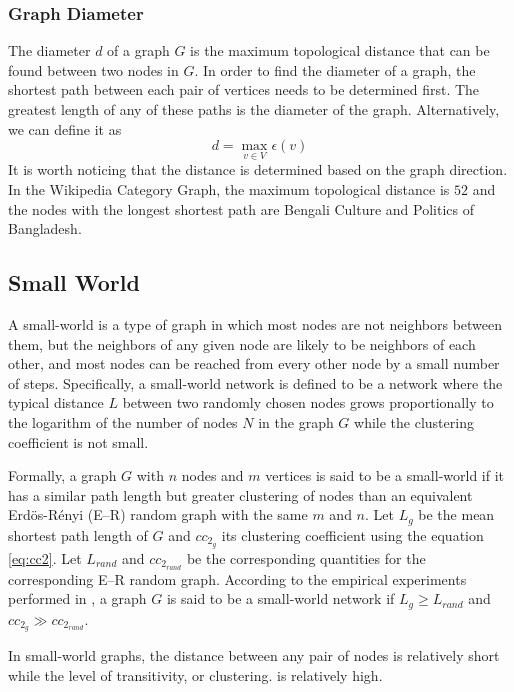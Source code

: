 \subsubsection{\hspace*{3pt} Graph Diameter}

The diameter $d$ of a graph $G$ is the maximum topological distance that can be found between two nodes in $G$. In order to find the diameter of a graph, the shortest path between each pair of vertices needs to be determined first. The greatest length of any of these paths is the diameter of the graph. Alternatively, we can define it as 
\begin{equation}
d=\max _{v\in V}\epsilon (v)
\end{equation}
It is worth noticing that the distance is determined based on the graph direction. In the Wikipedia Category Graph, the maximum topological distance is $52$ and the nodes with the longest shortest path are Bengali Culture and Politics of Bangladesh. 


\subsection{\hspace*{3pt} Small World}

A small-world is a type of graph in which most nodes are not neighbors between them, but the neighbors of any given node are likely to be neighbors of each other, and most nodes can be reached from every other node by a small number of steps. Specifically, a small-world network is defined to be a network where the typical distance $L$ between two randomly chosen nodes grows proportionally to the logarithm of the number of nodes $N$ in the graph $G$ while the clustering coefficient is not small.

Formally, a graph $G$ with $n$ nodes and $m$ vertices is said to be a small-world if it has a similar path length but greater clustering of nodes than an equivalent Erdös-Rényi (E–R) random graph with the same $m$ and $n$. Let $L_g$ be the mean shortest path length of $G$ and $cc_{2_g}$ its clustering coefficient using the equation \ref{eq:cc2}. Let $L_{rand}$ and  $cc_{2_{rand}}$ be the corresponding quantities for the corresponding E–R random graph. According to the empirical experiments performed in \cite{watts1998collective}, a graph $G$ is said to be a small-world network if $L_g \ge L_{rand}$ and $ cc_{2_g} \gg cc_{2_{rand}}$.

In small-world graphs, the distance between any pair of nodes is relatively short while the level of transitivity, or clustering. is relatively high.


